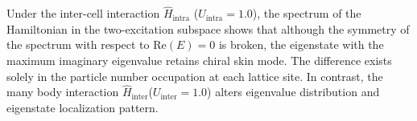 \documentclass[longbibliography, aps, prx, amsmath, amssymb, amsfonts, twocolumn,superscriptaddress, footinbib]{revtex4-1}
\begin{document}



	
	Under the inter-cell interaction $\hat{H}_{\text{intra}}$ ($U_{\text{intra}}=1.0$), the spectrum of the Hamiltonian in the two-excitation subspace shows that although the symmetry of the spectrum with respect to $\mathrm{Re}(E)=0$ is broken, the eigenstate with the maximum imaginary eigenvalue retains chiral skin mode. 
	The difference exists solely in the particle number occupation at each lattice site. In contrast, the many body interaction $\hat{H}_{\text{inter}}$($U_{\text{inter}}=1.0$) alters eigenvalue distribution and eigenstate localization pattern. 
\end{document}
